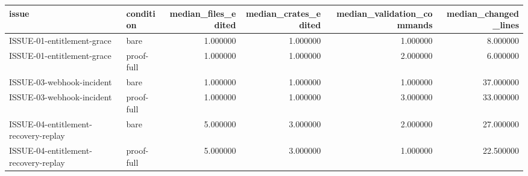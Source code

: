 \begin{tabular}{llrrrr}
\toprule
issue & condition & median_files_edited & median_crates_edited & median_validation_commands & median_changed_lines \\
\midrule
ISSUE-01-entitlement-grace & bare & 1.000000 & 1.000000 & 1.000000 & 8.000000 \\
ISSUE-01-entitlement-grace & proof-full & 1.000000 & 1.000000 & 2.000000 & 6.000000 \\
ISSUE-03-webhook-incident & bare & 1.000000 & 1.000000 & 1.000000 & 37.000000 \\
ISSUE-03-webhook-incident & proof-full & 1.000000 & 1.000000 & 3.000000 & 33.000000 \\
ISSUE-04-entitlement-recovery-replay & bare & 5.000000 & 3.000000 & 2.000000 & 27.000000 \\
ISSUE-04-entitlement-recovery-replay & proof-full & 5.000000 & 3.000000 & 1.000000 & 22.500000 \\
\bottomrule
\end{tabular}
